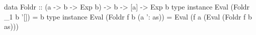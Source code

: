 \begin{code}
data Foldr :: (a -> b -> Exp b) -> b -> [a] -> Exp b
type instance Eval (Foldr _1 b '[]) = b
type instance Eval (Foldr f b (a ': as)) =
  Eval (f a (Eval (Foldr f b as)))
\end{code}
